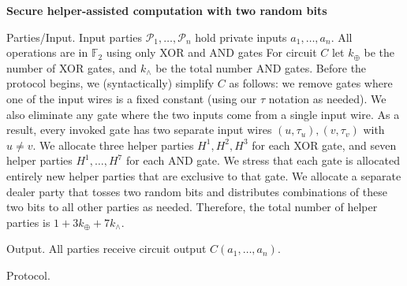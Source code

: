 \documentclass[10pt,a4paper]{article}
\begin{document}
{\bfseries Secure helper-assisted computation with two random bits


Parties/Input.
Input parties $\mathcal{P}_{1},\ldots,\mathcal{P}_{n}$
hold private inputs $a_{1},\ldots,a_{n}$.
All operations are in $\mathbb{F}_{2}$ using only XOR and AND gates
For circuit $C$ let $k_{\oplus}$ be the number of XOR gates, and $k_{\wedge}$ be the total number AND gates. Before the protocol begins, we (syntactically) simplify $C$ as follows:
we remove gates where one of the input wires is a fixed constant (using our $\tau$ notation as needed). We also eliminate any gate where the two inputs come from a single input wire.
As a result, every invoked gate has two separate input wires
$(u,\tau_{u}),(v,\tau_{v})$ with $u\neq v$.
We allocate three helper parties $H^{1},H^{2},H^{3}$ for each XOR gate, and seven helper parties $H^{1},\ldots,H^{7}$ for each AND gate. We stress that each gate is allocated entirely new helper parties that are exclusive to that gate. We allocate a separate
dealer party that tosses two random bits and distributes combinations of these two bits to all other parties as needed. Therefore, the total number of helper parties is
$1+3k_{\oplus}+7k_{\wedge}$.}\par




Output. All parties receive circuit output $C(a_{1},\ldots,a_{n})$.\par




Protocol.\par
\end{document}
